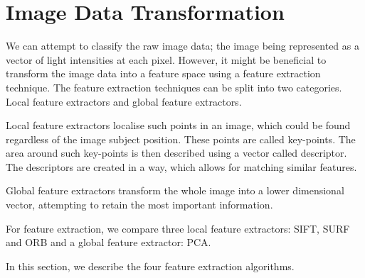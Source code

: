 \chapter{Image Data Transformation}

We can attempt to classify the raw image data; the image being represented as a vector of light intensities at each pixel. However, it might be beneficial to transform the image data into a feature space using a feature extraction technique. The feature extraction techniques can be split into two categories. Local feature extractors and global feature extractors. %

Local feature extractors localise such points in an image, which could be found regardless of the image subject position. These points are called key-points. The area around such key-points is then described using a vector called descriptor. The descriptors are created in a way, which allows for matching similar features.

Global feature extractors transform the whole image into a lower dimensional vector, attempting to retain the most important information.

For feature extraction, we compare three local feature extractors: SIFT, SURF and ORB and a global feature extractor: PCA.

In this section, we describe the four feature extraction algorithms.











